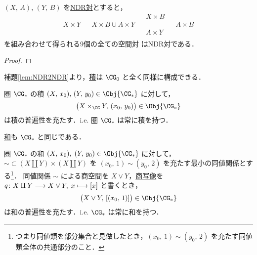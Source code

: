 \documentclass[algtopo_main]{subfiles}
\begin{document}
\begin{mylem}[label=lem:NDR2NDR]{}
    $(X,\, A),\, (Y,\, B)$ を\hyperref[def:NDR]{NDR対}とすると，
    \begin{align}
        & & & &X \times B & & \\
        X \times Y & &X \times B \cup A \times Y & & & &A\times B \\
        & & & &A \times Y & & \\
    \end{align}
    を組み合わせて得られる9個の全ての空間対
    はNDR対である．
\end{mylem}

\begin{proof}
    
\end{proof}

補題\ref{lem:NDR2NDR}より，\hyperref[prop:CG0-product]{積}は $\CG_0$ と全く同様に構成できる．

\begin{myprop}[label=prop:CGpt-product]{圏 $\CG_*$ の積}
    $(X,\, x_0),\, (Y,\, y_0) \in \Obj{\CG_*}$ に対して，
    \begin{align}
        \bigl(X \times_{\CG} Y,\, (x_0,\, y_0)\bigr) \in \Obj{\CG_*}
    \end{align}
    は積の普遍性を充たす．i.e. 圏 $\CG_*$ は常に積を持つ．
\end{myprop}

\hyperref[prop:CG0-sum]{和}も $\CG_*$ と同じである．

\begin{myprop}[label=prop:CGpt-sum]{圏 $\CG_*$ の和}
    $(X,\, x_0),\; (Y,\, y_0) \in \Obj{\CG_*}$ に対して，${\sim} \subset (X \amalg Y) \times (X \amalg Y)$ を $(x_0,\, 1) \sim (y_0,\, 2)$ を充たす最小の同値関係とする\footnote{つまり同値類を部分集合と見做したとき，$(x_0,\, 1) \sim (y_0,\, 2)$ を充たす同値類全体の共通部分のこと．}．
    同値関係 $\sim$ による商空間を $X \vee Y$，\hyperref[def:quotient-map]{商写像}を $q \colon X \amalg Y \longrightarrow X \vee Y,\; x \longmapsto [x]$ と書くとき，
    \begin{align}
        \bigl( X \vee Y,\, [(x_0,\, 1)]\bigr) \in \Obj{\CG_*}
    \end{align}
    は和の普遍性を充たす．i.e. $\CG_*$ は常に和を持つ．
\end{myprop}
\end{document}
